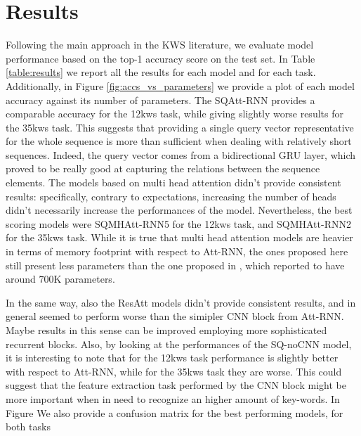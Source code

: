
\section{Results}
\label{sec:results}

Following the main approach in the KWS literature, we evaluate model performance based on the top-1 accuracy score on the test set. In Table \ref{table:results} we report all the results for each model and for each task. Additionally, in Figure \ref{fig:accs_vs_parameters} we provide a plot of each model accuracy against its number of parameters. The SQAtt-RNN provides a comparable accuracy for the 12kws task, while giving slightly worse results for the 35kws task. This suggests that providing a single query vector representative for the whole sequence is more than sufficient when dealing with relatively short sequences. Indeed, the query vector comes from a bidirectional GRU layer, which proved to be really good at capturing the relations between the sequence elements. The models based on multi head attention didn't provide consistent results: specifically, contrary to expectations, increasing the number of heads didn't necessarily increase the performances of the model. Nevertheless, the best scoring models were SQMHAtt-RNN5 for the 12kws task, and SQMHAtt-RNN2 for the 35kws task. While it is true that multi head attention models are heavier in terms of memory footprint with respect to Att-RNN, the ones proposed here still present less parameters than the one proposed in \cite{streamingkws2020Rybakov}, which reported to have around $700$K parameters.

In the same way, also the ResAtt models didn't provide consistent results, and in general seemed to perform worse than the simipler CNN block from Att-RNN. Maybe results in this sense can be improved employing more sophisticated recurrent blocks. Also, by looking at the performances of the SQ-noCNN model, it is interesting to note that for the 12kws task performance is slightly better with respect to Att-RNN, while for the 35kws task they are worse. This could suggest that the feature extraction task performed by the CNN block might be more important when in need to recognize an higher amount of key-words. In Figure We also provide a confusion matrix for the best performing models, for both tasks

